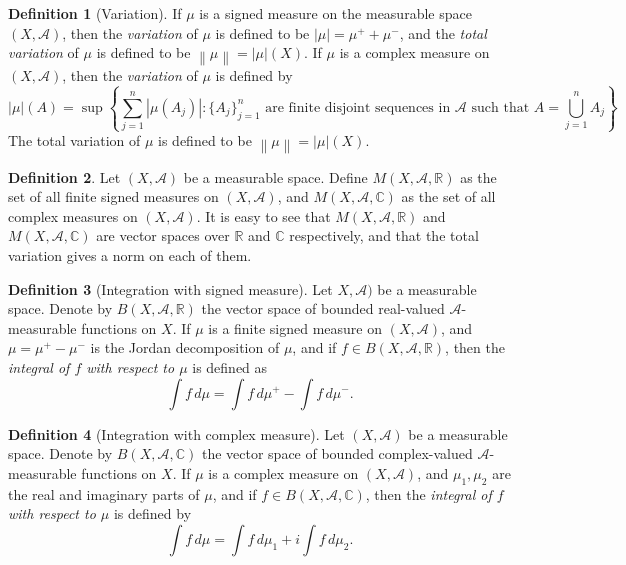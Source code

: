 \documentclass[12pt]{article}
\theoremstyle{definition}
\newtheorem{definition}{Definition}[section]
\newcommand{\real}{\mathbb{R}}   %
\newcommand{\C}{\mathbb{C}}    %
\newcommand{\algebra}{\mathscr{A}}
\newcommand\norm[1]{\left\lVert#1\right\rVert}
\begin{document}
\begin{definition}[Variation]
    If $\mu$ is a signed measure on the measurable space $(X,\algebra)$, then the \textit{variation} of $\mu$ is defined to be $|\mu|=\mu^++\mu^-$, and the \textit{total variation} of $\mu$ is defined to be $\norm{\mu}=|\mu|(X)$. If $\mu$ is a complex measure on $(X,\algebra)$, then the \textit{variation} of $\mu$ is defined by 
    \begin{equation*}
        |\mu|(A)=\sup\left\{\sum_{j=1}^n|\mu(A_j)|: \{A_j\}_{j=1}^n \text{ are finite disjoint sequences in $\algebra$ such that } A=\bigcup_{j=1}^n A_j\right\}.
    \end{equation*}
    The total variation of $\mu$ is defined to be $\norm{\mu}=|\mu|(X)$.
\end{definition}
\begin{definition}
    Let $(X,\algebra)$ be a measurable space. Define $M(X,\algebra,\real)$ as the set of all finite signed measures on $(X,\algebra)$, and $M(X,\algebra,\C)$ as the set of all complex measures on $(X,\algebra)$. It is easy to see that $M(X,\algebra,\real)$ and $M(X,\algebra,\C)$ are vector spaces over $\real$ and $\C$ respectively, and that the total variation gives a norm on each of them.
\end{definition}
\begin{definition}[Integration with signed measure]
    Let $X,\algebra)$ be a measurable space. Denote by $B(X,\algebra,\real)$ the vector space of bounded real-valued $\algebra$-measurable functions on $X$. If $\mu$ is a finite signed measure on $(X,\algebra)$, and $\mu=\mu^+-\mu^-$ is the Jordan decomposition of $\mu$, and if $f\in B(X,\algebra,\real)$, then the \textit{integral of $f$ with respect to $\mu$} is defined as
    \begin{equation*}
        \int f \, d\mu=\int f\, d\mu^+-\int f\, d\mu^-.
    \end{equation*}
\end{definition}
\begin{definition}[Integration with complex measure]
    Let $(X,\algebra)$ be a measurable space. Denote by $B(X,\algebra,\C)$ the vector space of bounded complex-valued $\algebra$-measurable functions on $X$. If $\mu$ is a complex measure on $(X,\algebra)$, and $\mu_1,\mu_2$ are the real and imaginary parts of $\mu$, and if $f\in B(X,\algebra,\C)$, then the \textit{integral of $f$ with respect to $\mu$} is defined by
    \begin{equation*}
        \int f\,d\mu=\int f\,d\mu_1+i\int f \,d\mu_2.
    \end{equation*}
\end{definition}
\end{document}

